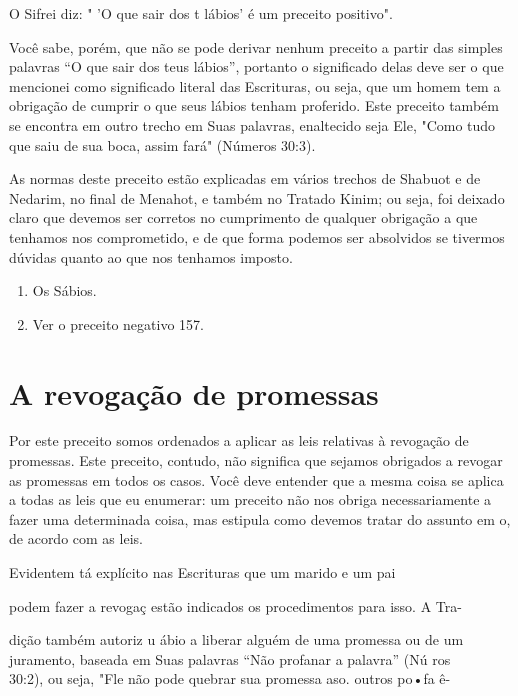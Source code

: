 O Sifrei diz: " 'O que sair dos t lábios' é um preceito positivo".

Você sabe, porém, que não se pode derivar nenhum preceito a partir das
sim­ples palavras ``O que sair dos teus lábios'', portanto o significado
delas deve ser o que mencionei como significado literal das Escrituras,
ou seja, que um homem tem a obrigação de cumprir o que seus lábios
tenham proferido. Este preceito também se encontra em outro trecho em
Suas palavras, enaltecido se­ja Ele, "Como tudo que saiu de sua boca,
assim fará" (Números 30:3).

As normas deste preceito estão explicadas em vários trechos de Sha­buot
e de Nedarim, no final de Menahot, e também no Tratado Kinim; ou seja,
foi deixado claro que devemos ser corretos no cumprimento de qualquer
obri­gação a que tenhamos nos comprometido, e de que forma podemos ser
absol­vidos se tivermos dúvidas quanto ao que nos tenhamos imposto.


\begin{enumerate}
\def\labelenumi{\arabic{enumi}.}
\setcounter{enumi}{126}
\item
 
 Os Sábios.
 
\item
 
 Ver o preceito negativo 157.
 
\end{enumerate}




\section{A revogação de promessas}

Por este preceito somos ordenados a aplicar as leis relativas à
revo­gação de promessas. Este preceito, contudo, não significa que
sejamos obriga­dos a revogar as promessas em todos os casos. Você deve
entender que a mes­ma coisa se aplica a todas as leis que eu enumerar:
um preceito não nos obriga necessariamente a fazer uma determinada
coisa, mas estipula como devemos tratar do assunto em o, de acordo com
as leis.

Evidentem tá explícito nas Escrituras que um marido e um pai

podem fazer a revogaç estão indicados os procedimentos para isso. A Tra-

dição também autoriz u ábio a liberar alguém de uma promessa ou de um\\
juramento, baseada em Suas palavras ``Não profanar a palavra'' (Nú ros\\
30:2), ou seja, "Fle não pode quebrar sua promessa aso. outros po•fa ê-

